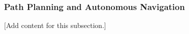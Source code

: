 
\subsubsection{Path Planning and Autonomous Navigation}
\label{subsubsec:design_7_3_path_planning_autonomy}

[Add content for this subsection.]
